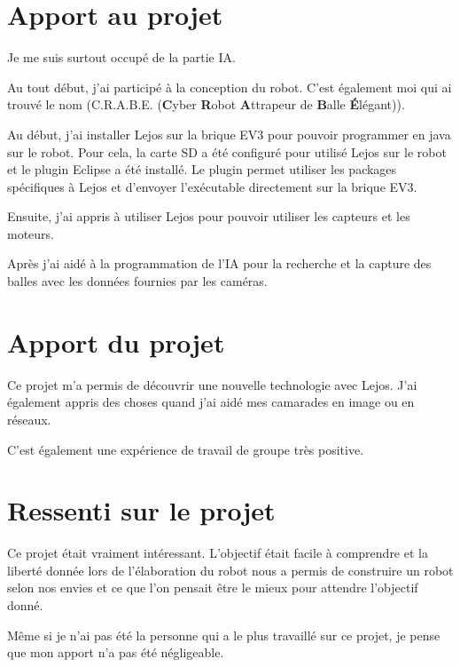 \documentclass[11pt]{article}
\author{\fontsize{14}{14}{\bf Aurélien CHEMIER}}
\title{\fontsize{16}{16}{{\bf Rapport MIF39}}}
\begin{document}
  \thispagestyle{empty}
  \maketitle

  \section{Apport au projet}

  Je me suis surtout occupé de la partie IA.

  Au tout début, j'ai participé à la conception du robot. 
  C'est également moi qui ai trouvé le nom (C.R.A.B.E. (\textbf{C}yber \textbf{R}obot \textbf{A}ttrapeur de \textbf{B}alle \textbf{É}légant)).

  Au début, j'ai installer Lejos sur la brique EV3 pour pouvoir programmer en java sur le robot. 
  Pour cela, la carte SD a été configuré pour utilisé Lejos sur le robot et le plugin Eclipse a été installé. 
  Le plugin permet utiliser les packages spécifiques à Lejos et d'envoyer l’exécutable directement sur la brique EV3.

  Ensuite, j'ai appris à utiliser Lejos pour pouvoir  utiliser les capteurs et les moteurs. 

  Après j'ai aidé à la programmation de l'IA pour la recherche et la capture des balles avec les données fournies par les caméras.
  
   \section{Apport du projet}

  Ce projet m'a permis de découvrir une nouvelle technologie avec Lejos. 
  J'ai également appris des choses quand j'ai aidé mes camarades en image ou en réseaux. 
  
  C'est également une expérience de travail de groupe très positive.

   \section{Ressenti sur le projet}

  Ce projet était vraiment intéressant. 
  L'objectif était facile à comprendre et la liberté donnée lors de l'élaboration du robot nous a permis de construire un robot selon nos envies et
  ce que l'on pensait être le mieux pour attendre l'objectif donné.

  Même si je n'ai pas été la personne qui a le plus travaillé sur ce projet, je pense que mon apport n'a pas été négligeable. 
\end{document}
